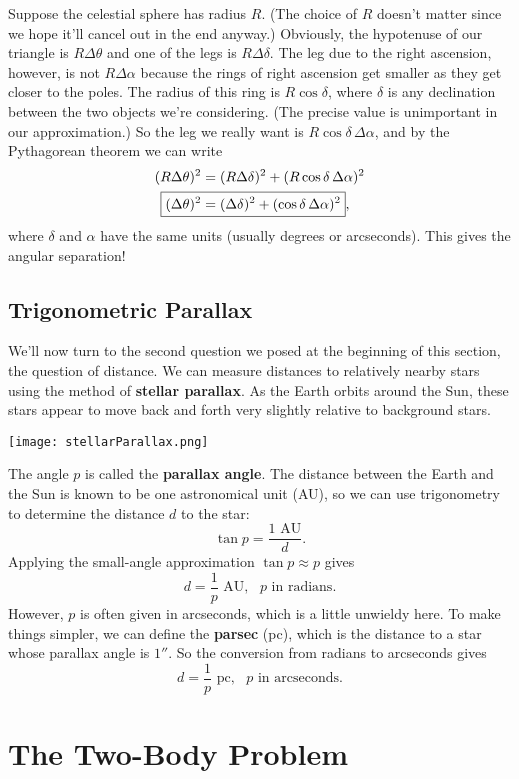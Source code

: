 \documentclass[../a062main.tex]{subfiles}
\begin{document}
Suppose the celestial sphere has radius $R$.
(The choice of $R$ doesn't matter since we hope it'll cancel out in the end anyway.)
Obviously, the hypotenuse of our triangle is $R \Delta \theta$ and one of the legs is $R \Delta \delta$.
The leg due to the right ascension, however, is not $R \Delta \alpha$ because the rings of right ascension get smaller as they get closer to the poles.
The radius of this ring is $R \cos \delta$, where $\delta$ is any declination between the two objects we're considering.
(The precise value is unimportant in our approximation.)
So the leg we really want is $R \cos \delta \,\Delta \alpha$, and by the Pythagorean theorem we can write
\begin{align*}
    (R \Delta \theta)^2 &= (R \Delta \delta)^2 + (R \cos \delta \,\Delta \alpha)^2 \\
    \Aboxed{(\Delta \theta)^2 &= (\Delta \delta)^2 + (\cos \delta \,\Delta \alpha)^2},
\end{align*}
where $\delta$ and $\alpha$ have the same units (usually degrees or arcseconds).
This gives the angular separation!

\subsection*{Trigonometric Parallax}
We'll now turn to the second question we posed at the beginning of this section, the question of distance.
We can measure distances to relatively nearby stars using the method of \textbf{stellar parallax}.
As the Earth orbits around the Sun, these stars appear to move back and forth very slightly relative to background stars.
\begin{center}
    \texttt{[image: stellarParallax.png]}
\end{center}
The angle $p$ is called the \textbf{parallax angle}.
The distance between the Earth and the Sun is known to be one astronomical unit (AU), so we can use trigonometry to determine the distance $d$ to the star:
\[ \tan p = \frac{1 \textrm{ AU}}{d}. \]
Applying the small-angle approximation $\tan p \approx p$ gives
\[ \boxed{d = \frac{1}{p} \textrm{ AU}}, \text{ $p$ in radians.} \]
However, $p$ is often given in arcseconds, which is a little unwieldy here.
To make things simpler, we can define the \textbf{parsec} (pc), which is the distance to a star whose parallax angle is $1''$.
So the conversion from radians to arcseconds gives
\[ \boxed{d = \frac{1}{p} \textrm{ pc}}, \text{ $p$ in arcseconds.} \]

\section{The Two-Body Problem}
\end{document}
